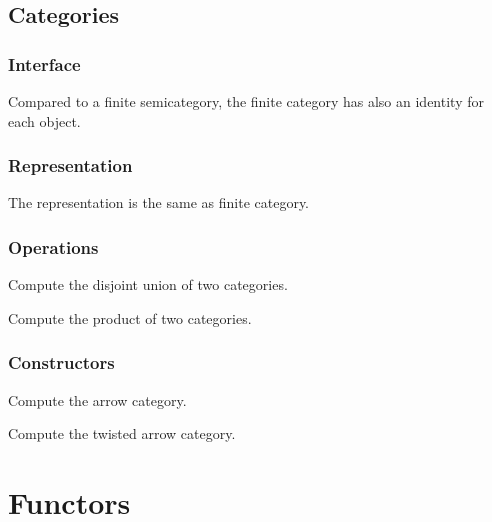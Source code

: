 \section{Categories}
\subsection*{Interface}
Compared to a finite semicategory, the finite category
has also an identity for each object.

\subsection*{Representation}

The representation is the same as finite category.

\subsection*{Operations}

\begin{exercise}
  Compute the disjoint union of two categories.

\end{exercise}

\begin{exercise}
  Compute the product of two categories.

\end{exercise}


\subsection*{Constructors}


\begin{exercise}
  Compute the arrow category.

\end{exercise}


\begin{exercise}
  Compute the twisted arrow category.

\end{exercise}


\chapter{Functors}


